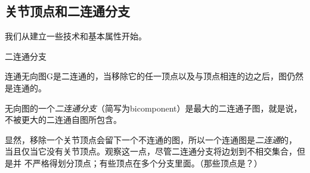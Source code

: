 \subsection{关节顶点和二连通分支}
我们从建立一些技术和基本属性开始。
\begin{definition}
二连通分支

连通无向图G是二连通的，当移除它的任一顶点以及与顶点相连的边之后，图仍然是连通的。

无向图的一个\emph{二连通分支}（简写为bicomponent）是最大的二连通子图，就是说，
不被更大的二连通自图所包含。
\end{definition}

显然，移除一个关节顶点会留下一个不连通的图，所以一个连通图是\emph{二连通}的，
当且仅当它没有关节顶点。观察这一点，尽管二连通分支将边划到不相交集合，但是并
不严格得划分顶点；有些顶点在多个分支里面。（那些顶点是？）
